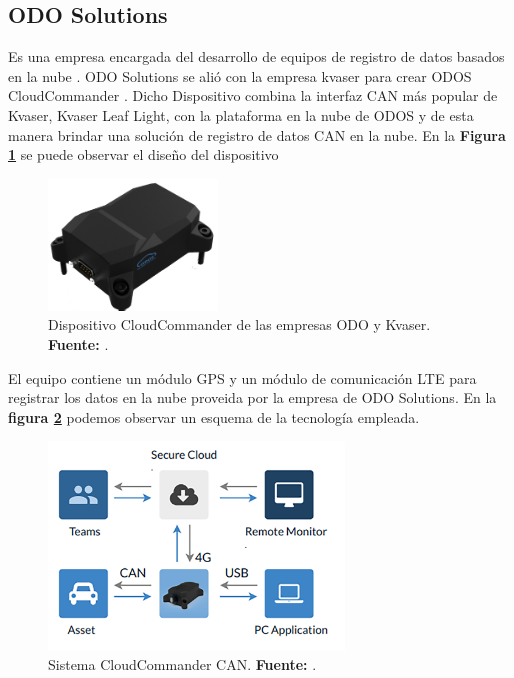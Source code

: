 \subsection{ODO Solutions}
Es una empresa encargada del desarrollo de equipos de registro de datos basados en la nube \cite{cite_odo_c3}.  ODO Solutions se alió con la empresa kvaser para crear ODOS CloudCommander \cite{cite_commander_c3}. Dicho Dispositivo combina la  interfaz CAN más popular de Kvaser, Kvaser Leaf Light, con la plataforma en la nube de ODOS y de esta manera  brindar una solución de registro de datos  CAN en la nube. En la \textbf{Figura \ref{fig_commander_c3}} se puede observar el diseño del dispositivo

\begin{figure}[H]
	\centering
	\includegraphics[width=0.4\textwidth]{./Cap3imagen/TCU.png}
	\caption[Dispositivo CloudCommander CAN.]{Dispositivo CloudCommander de las empresas ODO y Kvaser.\textbf{ Fuente:} \cite{cite_commander_c3}.}
	\label{fig_commander_c3} %
\end{figure}


El equipo contiene un módulo GPS y un módulo de comunicación LTE para registrar los datos en la nube proveida por la empresa de ODO Solutions. En la \textbf{figura \ref{fig_commanderSystem_c3}} podemos observar un esquema de la tecnología empleada.

\begin{figure}[H]
	\centering
	\includegraphics[width=0.7\textwidth]{./Cap3imagen/system-overview-2.png}
	\caption[Sistema CloudCommander CAN.]{Sistema CloudCommander CAN.\textbf{ Fuente:} \cite{cite_commander_c3}.}
	\label{fig_commanderSystem_c3} %
\end{figure}

